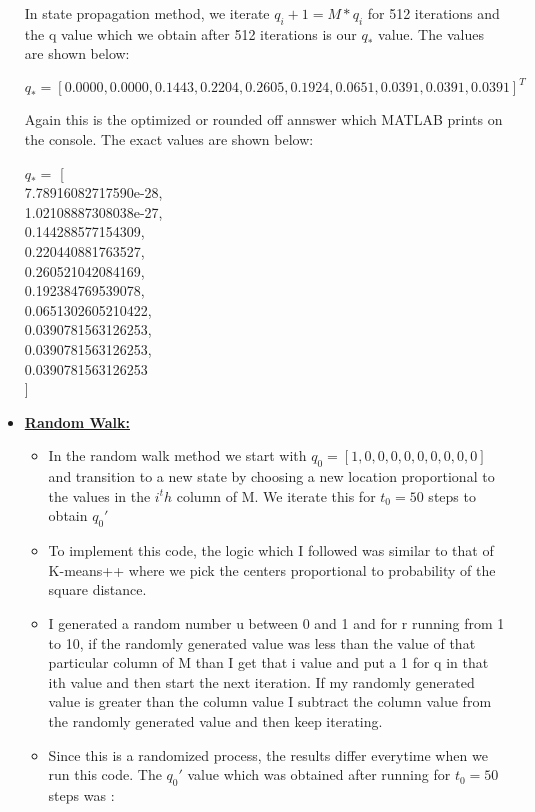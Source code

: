 \documentclass[11pt]{article}
\begin{document}
\begin{itemize}
	In state propagation method, we iterate $q_i+1= M*q_i$ for 512 iterations and the q value which we obtain after 512 iterations is our $q_*$ value. The values are shown below:
	
	$\boxed{q_* = [ 0.0000,
	0.0000,
	0.1443,
	0.2204,
	0.2605,
	0.1924,
	0.0651,
	0.0391,
	0.0391,
	0.0391]^T}$
	
	Again this is the optimized or rounded off annswer which MATLAB prints on the console. The exact values are shown below:
	
	$q_* =$
	[\\
	7.78916082717590e-28,\\
	1.02108887308038e-27,\\
	0.144288577154309,\\
	0.220440881763527,\\
	0.260521042084169,\\
	0.192384769539078,\\
	0.0651302605210422,\\
	0.0390781563126253,\\
	0.0390781563126253,\\
	0.0390781563126253\\
	]
	
	
	
	\item[] \textbf{\underline{Random Walk:}}
	
	\begin{itemize}
		\item In the random walk method we start with $q_0=[1,0,0,0,0,0,0,0,0,0]$ and transition to a new state by choosing a new location proportional to the values in the $i^th$ column of M. We iterate this for $t_0 =50$ steps to obtain $q_0 '$
	
	\item To implement this code, the logic which I followed was similar to that of K-means++ where we pick the centers proportional to probability of the square distance. 
	
	\item I generated a random number u between 0 and 1 and for r running from 1 to 10, if the randomly generated value was less than the value of that particular column of M than I get that i value and put a 1 for q in that ith value and then start the next iteration. If my randomly generated value is greater than the column value I subtract the column value from the randomly generated value and then keep iterating.
	
	\item Since this is a randomized process, the results differ everytime when we run this code. The $q_0'$ value which was obtained after running for $t_0=50 $ steps was :
	

\end{itemize}
\end{itemize}
\end{document}

